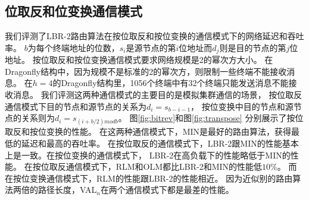 \subsection{位取反和位变换通信模式}

我们评测了LBR-2路由算法在按位取反和按位变换的通信模式下的网络延迟和吞吐率。
$b$为每个终端地址的位数，$s_i$是源节点的第$i$位地址而$d_j$则是目的节点的第$j$位地址。
按位取反和按位变换通信模式要求网络规模是2的幂次方大小。
在Dragonfly结构中，因为规模不是标准的2的幂次方，则限制一些终端不能接收消息。
在$h=4$的Dragonfly结构里，1056个终端中有32个终端只能发送消息不能接收消息。
我们评测这两种通信模式的主要目的是模拟集群通信的场景，
按位取反通信模式下目的节点和源节点的关系为$d_i=s_{b-i-1}$，
按位变换中目的节点和源节点的关系则为$d_i=s_{(i+b/2) mod b}$。
图\ref{fig:bitrev}和图\ref{fig:transpose} 分别展示了按位取反和按位变换的性能。
在这两种通信模式下，MIN是最好的路由算法，获得最低的延迟和最高的吞吐率。
在按位取反的通信模式下，LBR-2跟MIN的性能基本上是一致。在按位变换的通信模式下，
LBR-2在高负载下的性能略低于MIN的性能。
在按位取反通信模式下，RLM和OLM都比LBR-2和MIN的性能低$10\%$。
而在按位变换通信模式下，RLM的性能跟LBR-2的性能相近。
因为近似别的路由算法两倍的路径长度，VAL$_n$在两个通信模式下都是最差的性能。

\begin{figure*}[htbp]
  \centering
  \begin{minipage}[t]{\textwidth}
    \centering
    \caption{位取反通信模式}
    \label{fig:bitrev}
  \end{minipage}
\end{figure*}

\begin{figure*}[htbp]
  \centering
  \begin{minipage}[t]{\textwidth}
    \centering
    \caption{位变换通信模式}
    \label{fig:transpose}
  \end{minipage}
\end{figure*}


